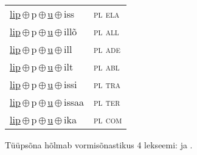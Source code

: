 \begin{minipage}{\textwidth}
\begin{sideways}
\begin{tabular}{l l}
\underline{lip}\,$\oplus$\,p\,$\oplus$\,\underline{u}\,$\oplus$\,iss & \textsc{ pl ela } \\
\underline{lip}\,$\oplus$\,p\,$\oplus$\,\underline{u}\,$\oplus$\,illõ & \textsc{ pl all } \\
\underline{lip}\,$\oplus$\,p\,$\oplus$\,\underline{u}\,$\oplus$\,ill & \textsc{ pl ade } \\
\underline{lip}\,$\oplus$\,p\,$\oplus$\,\underline{u}\,$\oplus$\,ilt & \textsc{ pl abl } \\
\underline{lip}\,$\oplus$\,p\,$\oplus$\,\underline{u}\,$\oplus$\,issi & \textsc{ pl tra } \\
\underline{lip}\,$\oplus$\,p\,$\oplus$\,\underline{u}\,$\oplus$\,issaa & \textsc{ pl ter } \\
\underline{lip}\,$\oplus$\,p\,$\oplus$\,\underline{u}\,$\oplus$\,ika & \textsc{ pl com } \\
\end{tabular}
\end{sideways}
\label{tab:tüüpsõnamall-lippu}

\end{minipage}

 
\vspace{1em}
\noindent Tüüpsõna hõlmab vormisõnastikus 4 lekseemi:  ja .
